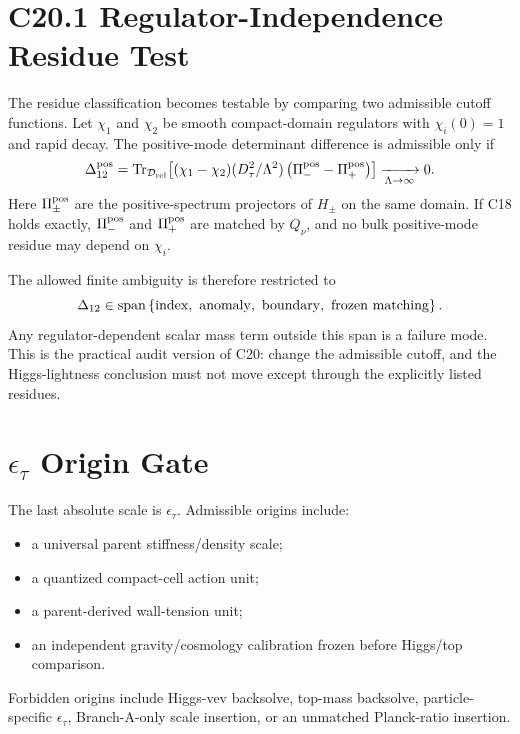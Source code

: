 \documentclass[11pt]{article}
\begin{document}
\section{C20.1 Regulator-Independence Residue Test}
The residue classification becomes testable by comparing two admissible
cutoff functions.  Let $\chi_1$ and $\chi_2$ be smooth compact-domain
regulators with $\chi_i(0)=1$ and rapid decay.  The positive-mode determinant
difference is admissible only if
\begin{equation}
\Delta_{12}^{\rm pos}
=
\operatorname{Tr}_{\mathcal D_{\rm rel}}
\!\left[
(\chi_1-\chi_2)(D_\tau^2/\Lambda^2)
\left(\Pi_-^{\rm pos}-\Pi_+^{\rm pos}\right)
\right]
\xrightarrow[\Lambda\to\infty]{}0 .
\end{equation}
Here $\Pi_\pm^{\rm pos}$ are the positive-spectrum projectors of $H_\pm$ on
the same domain.  If C18 holds exactly, $\Pi_-^{\rm pos}$ and
$\Pi_+^{\rm pos}$ are matched by $Q_\nu$, and no bulk positive-mode residue
may depend on $\chi_i$.

The allowed finite ambiguity is therefore restricted to
\begin{equation}
\Delta_{12}
\in
\operatorname{span}\left\lbrace
{\rm index,\ anomaly,\ boundary,\ frozen\ matching}
\right\rbrace .
\end{equation}
Any regulator-dependent scalar mass term outside this span is a failure mode.
This is the practical audit version of C20: change the admissible cutoff, and
the Higgs-lightness conclusion must not move except through the explicitly
listed residues.

\section{$\epsilon_\tau$ Origin Gate}
The last absolute scale is $\epsilon_\tau$.  Admissible origins include:
\begin{itemize}
\item a universal parent stiffness/density scale;
\item a quantized compact-cell action unit;
\item a parent-derived wall-tension unit;
\item an independent gravity/cosmology calibration frozen before Higgs/top comparison.
\end{itemize}
Forbidden origins include Higgs-vev backsolve, top-mass backsolve,
particle-specific $\epsilon_\tau$, Branch-A-only scale insertion, or an
unmatched Planck-ratio insertion.
\end{document}
